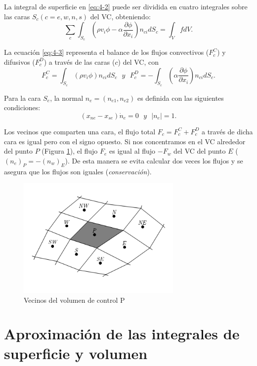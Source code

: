 \documentclass[a4paper,10pt, oneside]{book}
\begin{document}
La integral de superficie en \ref{eq:4-2} puede ser dividida en cuatro integrales sobre las caras $S_c (c=e,w,n,s)$ del VC, obteniendo:
\begin{equation}
	\sum_c \int_{S_c} \left( \rho v_i \phi - \alpha \frac{\partial \phi}{\partial x_i} \right) n_{ci} dS_c = \int_V f dV.
	\label{eq:4-3}
\end{equation}

La ecuación \ref{eq:4-3} representa el balance de los flujos convectivos ($F_c^C$) y difusivos ($F_c^D$) a través de las caras ($c$) del VC, con
\begin{equation}
	F^C_c = \int_{S_c} \left( \rho v_i \phi \right) n_{ci} d S_c ~~~ y ~~~ F^D_c = - \int_{S_c} \left( \alpha \frac{\partial \phi}{\partial x_i} \right) n_{ci} d S_c . \nonumber
\end{equation}

Para la cara $S_e$, la normal $n_e = (n_{e1},n_{e2})$ es definida con las siguientes condiciones:
\begin{equation}
	\left( x_{ne} - x_{se} \right) \dot n_e = 0 ~~~ y ~~~ \vert n_e \vert = 1. \nonumber
\end{equation}

Los vecinos que comparten una cara, el flujo total $F_c = F_c^C + F_c^D$ a través de dicha cara es igual pero con el signo opuesto. Si nos concentramos en el VC alrededor del punto $P$ (Figura \ref{img:4-5}), el flujo $F_e$ es igual al flujo $-F_w$ del VC del punto $E$ ($(n_e)_P = -(n_w)_E$). De esta manera se evita calcular dos veces los flujos y se asegura que los flujos son iguales (\textit{conservación}).
\begin{figure}[h!]
	\centering
	\includegraphics[width=8cm]{Img/4-6}
	\caption{Vecinos del volumen de control P}
	\label{img:4-5}
\end{figure}

\section{Aproximación de las integrales de superficie y volumen}
\end{document}
